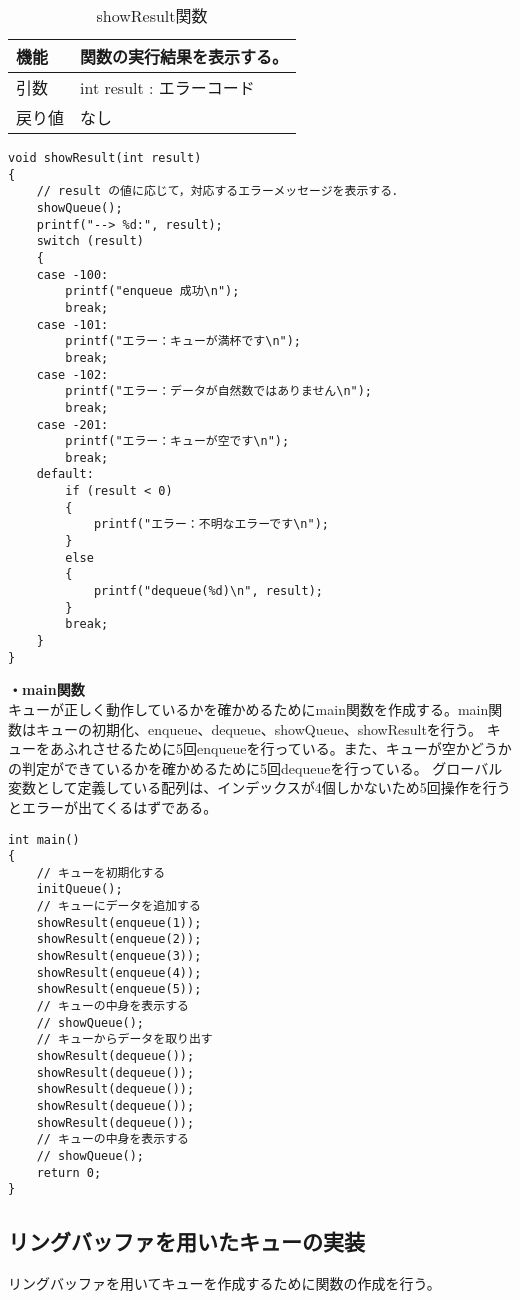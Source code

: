 \documentclass[dvipdfmx]{jsarticle}
\begin{document}
\begin{table}[ht]
  \centering
  \caption{showResult関数}
  \begin{tabular}{|p{5cm}|p{10cm}|}
    \hline
    機能  & 関数の実行結果を表示する。                                      \\
    \hline
    引数  & int result : エラーコード \\
    \hline
    戻り値 & なし \\
    \hline
  \end{tabular}
  \label{tab:showResult_func}
\end{table}
\begin{lstlisting}[caption={showResult関数}, label={lst:showResult_func}]
  void showResult(int result)
{
    // result の値に応じて，対応するエラーメッセージを表示する．
    showQueue();
    printf("--> %d:", result);
    switch (result)
    {
    case -100:
        printf("enqueue 成功\n");
        break;
    case -101:
        printf("エラー：キューが満杯です\n");
        break;
    case -102:
        printf("エラー：データが自然数ではありません\n");
        break;
    case -201:
        printf("エラー：キューが空です\n");
        break;
    default:
        if (result < 0)
        {
            printf("エラー：不明なエラーです\n");
        }
        else
        {
            printf("dequeue(%d)\n", result);
        }
        break;
    }
}
\end{lstlisting}
\textbf{・main関数}\\
キューが正しく動作しているかを確かめるためにmain関数を作成する。main関数はキューの初期化、enqueue、dequeue、showQueue、showResultを行う。
キューをあふれさせるために5回enqueueを行っている。また、キューが空かどうかの判定ができているかを確かめるために5回dequeueを行っている。
グローバル変数として定義している配列は、インデックスが4個しかないため5回操作を行うとエラーが出てくるはずである。
\begin{lstlisting}[caption={main関数}, label={lst:main_func}]
int main()
{
    // キューを初期化する
    initQueue();
    // キューにデータを追加する
    showResult(enqueue(1));
    showResult(enqueue(2));
    showResult(enqueue(3));
    showResult(enqueue(4));
    showResult(enqueue(5));
    // キューの中身を表示する
    // showQueue();
    // キューからデータを取り出す
    showResult(dequeue());
    showResult(dequeue());
    showResult(dequeue());
    showResult(dequeue());
    showResult(dequeue());
    // キューの中身を表示する
    // showQueue();
    return 0;
}
\end{lstlisting}
\subsection{リングバッファを用いたキューの実装}
リングバッファを用いてキューを作成するために関数の作成を行う。
\end{document}
